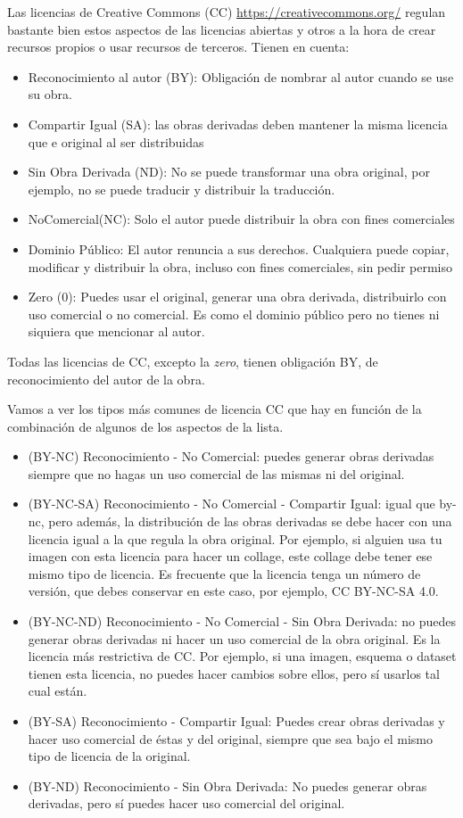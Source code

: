 Las licencias de Creative Commons (CC) \url{https://creativecommons.org/} regulan bastante bien estos aspectos de las licencias abiertas y otros a la hora de crear recursos propios o usar recursos de terceros. Tienen en cuenta:
\begin{itemize}
    \item Reconocimiento al autor (BY): Obligación de nombrar al autor cuando se use su obra.
    \item Compartir Igual (SA): las obras derivadas deben mantener la misma licencia que e original al ser distribuidas
    \item Sin Obra Derivada (ND): No se puede transformar una obra original, por ejemplo, no se puede traducir y distribuir la traducción.
    \item NoComercial(NC): Solo el autor puede distribuir la obra con fines comerciales
    \item Dominio Público: El autor renuncia a sus derechos. Cualquiera puede copiar, modificar y distribuir la obra, incluso con fines comerciales, sin pedir permiso
    \item Zero (0): Puedes usar el original, generar una obra derivada, distribuirlo con uso comercial o no comercial. Es como el dominio público pero no tienes ni siquiera que mencionar al autor.
\end{itemize}

Todas las licencias de CC, excepto la \textit{zero}, tienen obligación BY, de reconocimiento del autor de la obra.

Vamos a ver los tipos más comunes de licencia CC que hay en función de la combinación de algunos de los aspectos de la lista.
\begin{itemize}
    \item (BY-NC) Reconocimiento - No Comercial: puedes generar obras derivadas siempre que no hagas un uso comercial de las mismas ni del original. 
    \item (BY-NC-SA) Reconocimiento - No Comercial - Compartir Igual: igual que by-nc, pero además, la distribución de las obras derivadas se debe hacer con una licencia igual a la que regula la obra original. Por ejemplo, si alguien usa tu imagen con esta licencia para hacer un collage, este collage debe tener ese mismo tipo de licencia. Es frecuente que la licencia tenga un número de versión, que debes conservar en este caso, por ejemplo, CC BY-NC-SA 4.0.
    \item (BY-NC-ND) Reconocimiento - No Comercial - Sin Obra Derivada:  no puedes generar obras derivadas ni hacer un uso comercial de la obra original. Es la licencia más restrictiva de CC. Por ejemplo, si una imagen, esquema o dataset tienen esta licencia, no puedes hacer cambios sobre ellos, pero sí usarlos tal cual están.
    \item (BY-SA) Reconocimiento - Compartir Igual: Puedes crear obras derivadas y hacer uso comercial de éstas y del original, siempre que sea bajo el mismo tipo de licencia de la original.
    \item  (BY-ND) Reconocimiento - Sin Obra Derivada: No puedes generar obras derivadas, pero sí puedes hacer uso comercial del original. 
\end{itemize}

